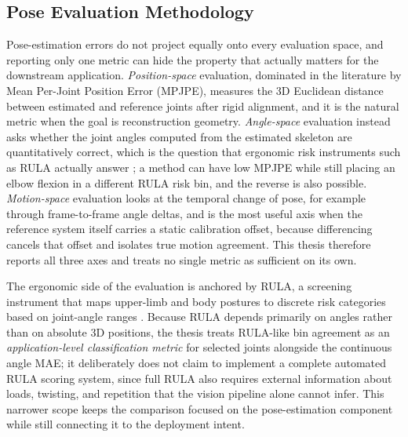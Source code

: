 \documentclass[12pt,a4paper]{article}
\begin{document}
\subsection{Pose Evaluation Methodology}

Pose-estimation errors do not project equally onto every evaluation space,
and reporting only one metric can hide the property that actually matters
for the downstream application.
\emph{Position-space} evaluation, dominated in the literature by Mean
Per-Joint Position Error (MPJPE), measures the 3D Euclidean distance between
estimated and reference joints after rigid alignment, and it is the natural
metric when the goal is reconstruction geometry.
\emph{Angle-space} evaluation instead asks whether the joint angles computed
from the estimated skeleton are quantitatively correct, which is the
question that ergonomic risk instruments such as RULA actually answer
\cite{mcatamney1993rula}; a method can have low MPJPE while still placing
an elbow flexion in a different RULA risk bin, and the reverse is also
possible.
\emph{Motion-space} evaluation looks at the temporal change of pose, for
example through frame-to-frame angle deltas, and is the most useful axis when
the reference system itself carries a static calibration offset, because
differencing cancels that offset and isolates true motion agreement.
This thesis therefore reports all three axes and treats no single metric as
sufficient on its own.

The ergonomic side of the evaluation is anchored by RULA, a screening
instrument that maps upper-limb and body postures to discrete risk
categories based on joint-angle ranges \cite{mcatamney1993rula}.
Because RULA depends primarily on angles rather than on absolute 3D
positions, the thesis treats RULA-like bin agreement as an
\emph{application-level classification metric} for selected joints alongside
the continuous angle MAE; it deliberately does not claim to implement a
complete automated RULA scoring system, since full RULA also requires
external information about loads, twisting, and repetition that the vision
pipeline alone cannot infer.
This narrower scope keeps the comparison focused on the pose-estimation
component while still connecting it to the deployment intent.
\end{document}
